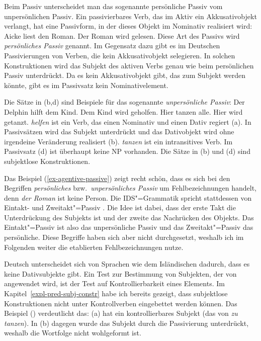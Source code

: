 \noindent
Beim Passiv unterscheidet man das sogenannte persönliche Passiv vom unpersönlichen Passiv.
Ein passivierbares Verb, das im Aktiv ein Akkusativobjekt verlangt, hat eine Passivform,
in der dieses Objekt im Nominativ realisiert wird:
\eal
\label{ex-agentive-passive}
\ex Aicke liest den Roman.
\ex Der Roman wird gelesen.
\zl
Diese Art des Passivs wird \emph{persönliches Passiv} genannt. 
Im Gegensatz dazu gibt es im Deutschen Passivierungen von Verben, die kein
Akkusativobjekt selegieren. In solchen Konstruktionen wird das Subjekt
des aktiven Verbs genau wie beim persönlichen Passiv unterdrückt.
Da es kein Akkusativobjekt gibt, das zum Subjekt
werden könnte, gibt es im Passivsatz kein Nominativelement.

Die Sätze in (b,d) sind Beispiele für das sogenannte \emph{unpersönliche Passiv}:
\eal
\label{ex-agentive-passive-dat}
\ex Der Delphin hilft dem Kind.
\ex\label{ex-dem-Kind-wird-geholfen} 
Dem Kind wird geholfen.
\ex Hier tanzen alle.
\ex\label{ex-hier-wird-getanzt}
Hier wird getanzt.
\zl
\emph{helfen} ist ein Verb, das einen Nominativ und einen Dativ regiert (a).
In Passivsätzen wird das Subjekt unterdrückt und das Dativobjekt wird ohne
irgendeine Veränderung realisiert (b). \emph{tanzen} ist ein intransitives Verb.
Im Passivsatz (d) ist überhaupt keine NP vorhanden. Die Sätze in (b) und (d)
sind subjektlose Konstruktionen. 

Das Beispiel (\ref{ex-agentive-passive}) zeigt recht schön, dass es sich bei den Begriffen
\emph{persönliches} bzw.\ \emph{unpersönliches Passiv} um Fehlbezeichnungen handelt, denn \emph{der
  Roman} ist keine Person. Die IDS"=Grammatik spricht stattdessen von Eintakt- und
Zweitakt"=Passiv \citep[Abschnitt 2.1]{Zifonun97b}. Die Idee ist dabei, dass der erste Takt die Unterdrückung des Subjekts ist und der
zweite das Nachrücken des Objekts. Das Eintakt"=Passiv ist also das unpersönliche Passiv und das
Zweitakt"=Passiv das persönliche. Diese Begriffe haben sich aber nicht durchgesetzt, weshalb ich im
Folgenden weiter die etablierten Fehlbezeichnungen nutze.

Deutsch unterscheidet sich von Sprachen wie dem Isländischen \citep*{ZMT85a}
dadurch, dass es keine Dativsubjekte\label{page-dativsubjekte} gibt.
Ein Test zur Bestimmung von Subjekten, der von \citet*[]{ZMT85a} angewendet wird,
ist der Test auf Kontrollierbarkeit eines Elements. Im Kapitel~\ref{expl-pred-subj-constr} habe ich bereits
gezeigt, dass subjektlose Konstruktionen nicht unter Kontrollverben eingebettet werden können.
Das Beispiel () verdeutlicht das:
\eal
{}
\zl
(a) hat ein kontrollierbares Subjekt (das von \emph{zu tanzen}). In (b) dagegen wurde das
Subjekt durch die Passivierung unterdrückt, weshalb die Wortfolge nicht wohlgeformt ist.

